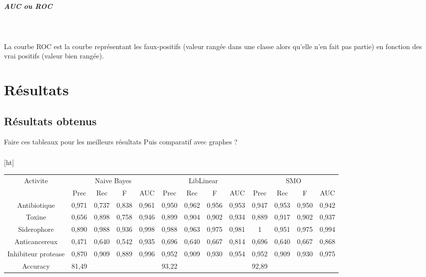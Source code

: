 \documentclass[a4paper,10pt]{report}
\begin{document}
	     \paragraph{AUC ou ROC}\\
		
	     ~\\La courbe ROC est la courbe représentant les faux-positifs (valeur rangée dans une classe alors qu'elle n'en fait pas partie) en fonction des vrai positifs (valeur bien rangée).
	     
	 
   \chapter{Résultats}

	  
      \section{Résultats obtenus}
	 
	  
	  Faire ces tableaux pour les meilleurs résultats
	  Puis comparatif avec graphes ? 
	  \paragraph{} [ht]
	   \begin{flushleft}
	    \leftskip -3cm
	    \begin{tabular}{|c||c|c|c|c||c|c|c|c||c|c|c|c|}\hline
	      {Activite} & \multicolumn{4}{c||}{Naive Bayes} & \multicolumn{4}{c||}{LibLinear} & \multicolumn{4}{c|}{SMO} \\\cline{2-13}
	       & Prec & Rec & F & AUC & Prec & Rec & F & AUC & Prec & Rec & F & AUC \\\hline
	      Antibiotique & 0,971 & 0,737 & 0,838 & 0,961 & 0,950 & 0,962 & 0,956 & 0,953 & 0,947 & 0,953 & 0,950 & 0,942 \\\hline
	      Toxine & 0,656 & 0,898 & 0,758 & 0,946 & 0,899 & 0,904 & 0,902 & 0,934 & 0,889 & 0,917 & 0,902 & 0,937  \\\hline
	      Siderophore & 0,890 & 0,988 & 0,936 & 0,998 & 0,988 & 0,963 & 0,975 & 0,981 & 1 & 0,951 & 0,975 & 0,994  \\\hline
	      Anticancereux & 0,471 & 0,640 & 0,542 & 0,935 & 0,696 & 0,640 & 0,667 & 0,814 & 0,696 & 0,640 & 0,667 & 0,868 \\\hline
	      Inhibiteur protease & 0,870 & 0,909 & 0,889 & 0,996 & 0,952 & 0,909 & 0,930 & 0,954 & 0,952 & 0,909 & 0,930 & 0,975 \\\hline
	      Accuracy & \multicolumn{4}{l||}{81,49} & \multicolumn{4}{l||}{93,22} & \multicolumn{4}{l|}{92,89} \\\hline
	    \end{tabular}
	     \label{tableau 1}
	  \end{flushleft}
	  
\end{document}
